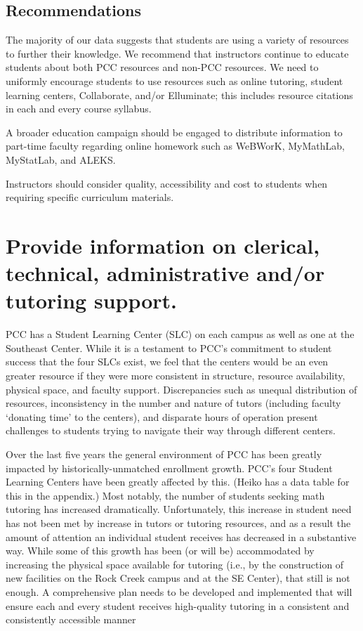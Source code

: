 \subsection{Recommendations}
The majority of our data suggests that students are using a variety of resources to further their knowledge. We recommend that instructors continue to educate students about both PCC resources and non-PCC resources. We need to uniformly encourage students to use resources such as online tutoring, student learning centers, Collaborate, and/or Elluminate; this includes resource citations in each and every course syllabus.

A broader education campaign should be engaged to distribute information to part-time faculty regarding online homework such as WeBWorK, MyMathLab, MyStatLab, and ALEKS. 

Instructors should consider quality, accessibility and cost to students when requiring specific curriculum materials. 

\section{Provide information on clerical, technical, administrative and/or tutoring support.}
PCC has a Student Learning Center (SLC) on each campus as well as one at  the Southeast Center.  While it is a testament to PCC's commitment to student success that the four SLCs exist, we feel that the centers would be an even greater resource if they were more consistent in structure, resource availability, physical space, and faculty support.  Discrepancies such as unequal distribution of resources, inconsistency in the number and nature of tutors (including faculty `donating time' to the centers), and disparate hours of operation present challenges to students trying to navigate their way through different centers. 

Over the last five years the general environment of PCC has been greatly impacted by historically-unmatched enrollment growth. PCC's four Student Learning Centers have been greatly affected by this. (Heiko has a data table for this in the appendix.) Most notably, the number of students seeking math tutoring has increased dramatically.  Unfortunately, this increase in student need has not been met by increase in tutors or tutoring resources, and as a result the amount of attention an individual student receives has decreased in a substantive way.   While some of this growth has been (or will be) accommodated by increasing the physical space available for tutoring (i.e., by the construction of new facilities on the Rock Creek campus and at the SE Center), that still is not enough.  A comprehensive plan needs to be developed and implemented that will ensure each and every student receives high-quality tutoring in a consistent and consistently accessible manner

